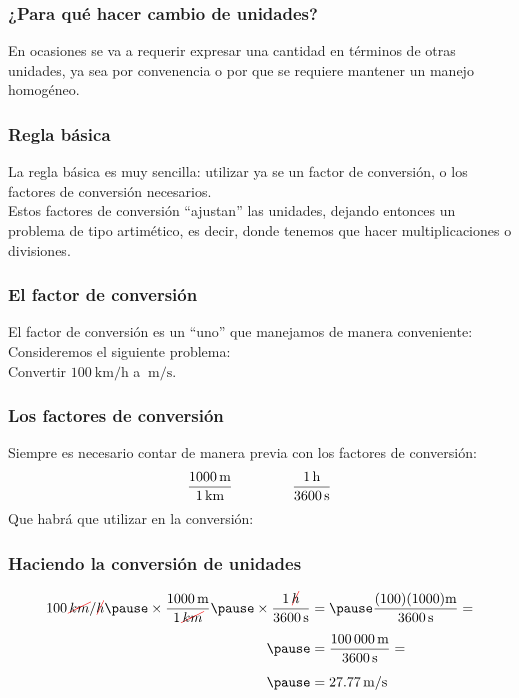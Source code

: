 \documentclass[12pt]{beamer}
\begin{document}
\begin{frame}
\frametitle{¿Para qué hacer cambio de unidades?}
En ocasiones se va a requerir expresar una cantidad en términos de otras unidades, ya sea por convenencia o por que se requiere mantener un manejo homogéneo.
\end{frame}
\begin{frame}
\frametitle{Regla básica}
La regla básica es muy sencilla: \pause utilizar ya se un factor de conversión, o los factores de conversión necesarios.
\\
\bigskip
\pause
Estos factores de conversión \enquote{ajustan} las unidades, dejando entonces un problema de tipo artimético, es decir, donde tenemos que hacer multiplicaciones o divisiones.
\end{frame}
\begin{frame}
\frametitle{El factor de conversión}
El factor de conversión es un \enquote{uno} que manejamos de manera conveniente: \pause Consideremos el siguiente problema:
\\
\bigskip
\pause
Convertir $\SI[per-mode=symbol]{100}{\kilo\meter\per\hour}$ a $\SI[per-mode=symbol]{}{\meter\per\second}$. 
\end{frame}
\begin{frame}
\frametitle{Los factores de conversión}
Siempre es necesario contar de manera previa con los factores de conversión:
\pause
\begin{align*}
\dfrac{\SI{1000}{\meter}}{\SI{1}{\kilo\meter}} \hspace{1.5cm} \dfrac{\SI{1}{\hour}}{\SI{3600}{\second}}
\end{align*}
\pause
Que habrá que utilizar en la conversión:
\end{frame}
\begin{frame}
\frametitle{Haciendo la conversión de unidades}
\begin{eqnarray*}
\begin{aligned}
\SI[per-mode=fraction]{100}{\Cancel[red]{\kilo\meter}\per\Cancel[red]{\hour}} \pause \times \dfrac{\SI{1000}{\meter}}{\SI{1}{\Cancel[red]{\kilo\meter}}} \pause \times \dfrac{\SI{1}{\Cancel[red]{\hour}}}{\SI{3600}{\second}} &= \pause \dfrac{(100)(1000) \SI{}{\meter}}{\SI{3600}{\second}} = \\[0.5em] \pause
&= \dfrac{\SI{100000}{\meter}}{\SI{3600}{\second}} = \\[0.5em] \pause
&= \SI[per-mode=symbol]{27.77}{\meter\per\second}
\end{aligned}
\end{eqnarray*}
\end{frame}
\end{document}
